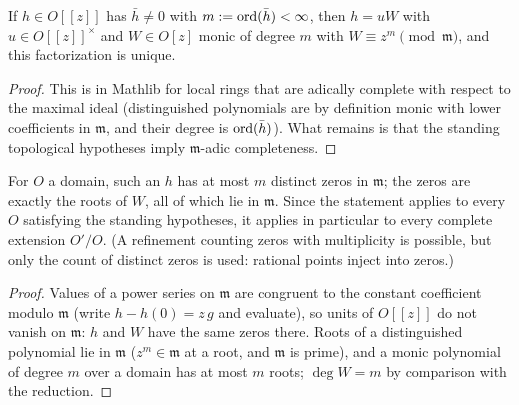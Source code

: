 \begin{theorem}
\label{thm:wprep}
\leanok
{}
If $h \in O[[z]]$ has $\bar h \ne 0$ with $m := \operatorname{ord}(\bar h) < \infty$, then $h = u W$
with $u \in O[[z]]^\times$ and $W \in O[z]$ monic of degree $m$ with
$W \equiv z^m \pmod{\mathfrak m}$, and this factorization is unique.
\end{theorem}
\begin{proof}
\leanok
This is in Mathlib for local rings that are adically complete with respect to the
maximal ideal (distinguished polynomials are by definition monic with lower coefficients
in $\mathfrak m$, and their degree is $\operatorname{ord}(\bar h)$). What remains is that the standing
topological hypotheses imply $\mathfrak m$-adic completeness.
\end{proof}

\begin{corollary}
\label{cor:wprep-count}
\leanok
{}
For $O$ a domain, such an $h$ has at most $m$ distinct zeros in $\mathfrak m$; the zeros
are exactly the roots of $W$, all of which lie in $\mathfrak m$. Since the statement
applies to every $O$ satisfying the standing hypotheses, it applies in particular to
every complete extension $O'/O$. (A refinement counting zeros with multiplicity is
possible, but only the count of distinct zeros is used: rational points inject into
zeros.)
\end{corollary}
\begin{proof}
\leanok
Values of a power series on $\mathfrak m$ are congruent to the constant coefficient
modulo $\mathfrak m$ (write $h - h(0) = z\,g$ and evaluate), so units of $O[[z]]$ do
not vanish on $\mathfrak m$: $h$ and $W$ have the same zeros there. Roots of a
distinguished polynomial lie in $\mathfrak m$ ($z^m \in \mathfrak m$ at a root, and
$\mathfrak m$ is prime), and a monic polynomial of degree $m$ over a domain has at most
$m$ roots; $\deg W = m$ by comparison with the reduction.
\end{proof}

